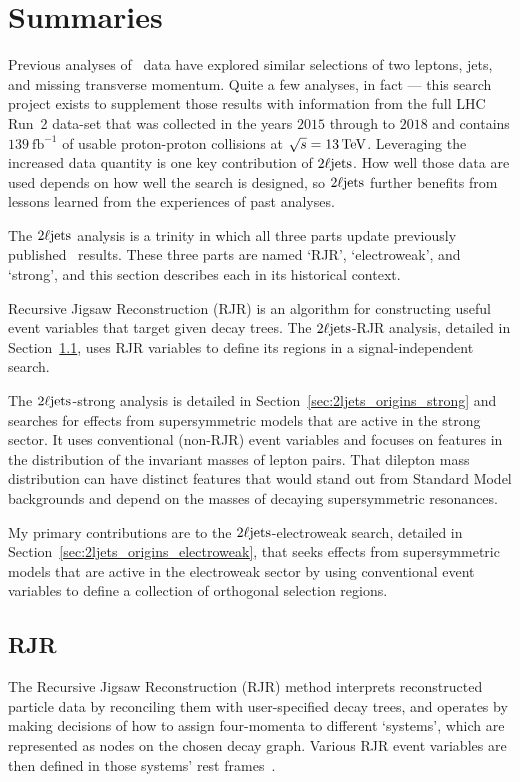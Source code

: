\section{Summaries}
\label{sec:2ljets_context}
Previous analyses of \atlas\ data have explored similar selections of
two leptons, jets, and missing transverse momentum.
Quite a few analyses, in fact ---
this search project exists to supplement those results with information from
the full LHC Run~2 data-set that was collected in the years $2015$
through to $2018$ and contains
$139~\mathrm{fb}^{-1}$ of usable proton-proton collisions at
$\sqrt{s} = 13\,\eV[T]$.
Leveraging the increased data quantity is one key contribution of $\twoljets$.
How well those data are used depends on how well the search is designed, so
$\twoljets$ further benefits from lessons learned from the experiences of
past analyses.

The $\twoljets$ analysis is a trinity in which all three parts update
previously published \atlas\ results.
These three parts are named `RJR', `electroweak', and `strong',
and this section describes each in its historical context.

Recursive Jigsaw Reconstruction (RJR) is an algorithm for constructing useful
event variables that target given decay trees.
The $\twoljets$-RJR analysis, detailed in Section~\ref{sec:2ljets_origins_rjr},
uses RJR variables to define its regions in a signal-independent search.

The $\twoljets$-strong analysis is
detailed in Section~\ref{sec:2ljets_origins_strong} and
searches for effects from supersymmetric models that are active in the strong
sector.
It uses conventional (non-RJR) event variables and focuses on features in the
distribution of the invariant masses of lepton pairs.
That dilepton mass distribution can have distinct features that would stand
out from Standard Model backgrounds and depend on the masses of decaying
supersymmetric resonances.

My primary contributions are to the $\twoljets$-electroweak search,
detailed in Section~\ref{sec:2ljets_origins_electroweak}, that seeks effects
from supersymmetric models that are active in the electroweak
sector by using conventional event variables to define a collection of
orthogonal selection regions.


\subsection{RJR}
\label{sec:2ljets_origins_rjr}
The Recursive Jigsaw Reconstruction (RJR) method interprets reconstructed
particle data by reconciling them with user-specified decay trees, and operates
by making decisions of how to assign four-momenta to different `systems',
which are represented as nodes on the chosen decay graph.
Various RJR event variables are then defined in those systems' rest
frames~\cite{jackson2017sparticles, jackson2017rjr}.

